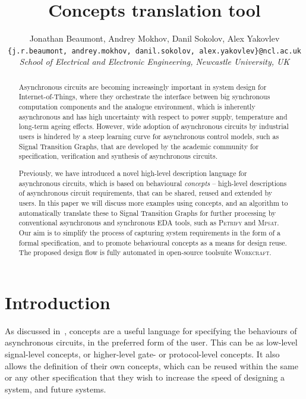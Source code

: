 \documentclass[british, journal]{IEEEtran}
\newcommand{\noun}[1]{\textsc{#1}}
\begin{document}
\twocolumn

\title{Concepts translation tool}
\author{Jonathan Beaumont, Andrey Mokhov, Danil Sokolov, Alex Yakovlev\\
\texttt{\{j.r.beaumont, andrey.mokhov, danil.sokolov,
alex.yakovlev\}@ncl.ac.uk}\\
\emph{School of Electrical and Electronic Engineering, Newcastle University,
UK}}

\maketitle

\begin{abstract}
Asynchronous circuits are becoming increasingly important in
system design for Internet-of-Things, where they orchestrate
the interface between big synchronous computation components
and the analogue environment, which is inherently asynchronous
and has high uncertainty with respect to power supply,
temperature and long-term ageing effects.
However, wide adoption of asynchronous circuits by industrial users is
hindered by a steep learning curve for asynchronous control models,
such as Signal Transition Graphs, that are developed by the academic
community for specification, verification and synthesis of
asynchronous circuits.

Previously, we have introduced a novel high-level description language
for asynchronous circuits, which is based on behavioural
\textit{concepts} -- high-level descriptions of asynchronous circuit
requirements, that can be shared, reused and extended by users. 
In this paper we will discuss more examples using concepts, and an algorithm to
automatically translate these to Signal Transition Graphs for further processing
by conventional asynchronous and synchronous EDA tools, such as \noun{Petrify}
and \noun{Mpsat}. Our aim is to simplify the process of capturing system
requirements in the form of a formal specification, and to promote behavioural
concepts as a means for design reuse. The proposed design flow is fully
automated in open-source toolsuite \noun{Workcraft}.
\end{abstract}

\sloppy
\thispagestyle{empty}
\vspace{-3mm}
\section{Introduction}

As discussed in~\cite{2015_Beaumont_MEMOCODE}, concepts are a useful language for specifying
the behaviours of asynchronous circuits, in the preferred form of the user. This can be as low-level 
signal-level concepts, or higher-level gate- or protocol-level concepts. It also allows the definition of 
their own concepts, which can be reused within the same or any other specification that they wish
to increase the speed of designing a system, and future systems. 
\end{document}
